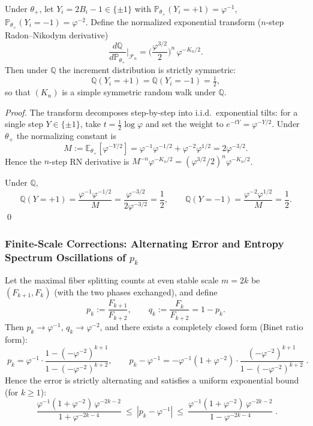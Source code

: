 \begin{proposition}\label{prop:pom-golden-esscher-symmetrization}
Under \(\theta_+\), let \(Y_i=2B_i-1\in\{\pm 1\}\) with \(\mathbb{P}_{\theta_+}(Y_i=+1)=\varphi^{-1}\), \(\mathbb{P}_{\theta_+}(Y_i=-1)=\varphi^{-2}\).
Define the normalized exponential transform (\(n\)-step Radon--Nikodym derivative)
\[
\boxed{\;
\frac{d\mathbb{Q}}{d\mathbb{P}_{\theta_+}}\Big|_{\mathcal{F}_n}
=\Big(\frac{\varphi^{3/2}}{2}\Big)^{n}\,\varphi^{-K_n/2}.\;}
\]
Then under \(\mathbb{Q}\) the increment distribution is strictly symmetric:
\[
\boxed{\;\mathbb{Q}(Y_i=+1)=\mathbb{Q}(Y_i=-1)=\tfrac12,\;}
\]
so that \((K_n)\) is a simple symmetric random walk under \(\mathbb{Q}\).
\end{proposition}

\begin{proof}
The transform decomposes step-by-step into i.i.d.\ exponential tilts: for a single step \(Y\in\{\pm 1\}\), take
\(
t=\tfrac12\log\varphi
\)
and set the weight to \(e^{-tY}=\varphi^{-Y/2}\).
Under \(\theta_+\) the normalizing constant is
\[
M:=\mathbb{E}_{\theta_+}[\varphi^{-Y/2}]
=\varphi^{-1}\varphi^{-1/2}+\varphi^{-2}\varphi^{1/2}
=2\varphi^{-3/2}.
\]
Hence the \(n\)-step RN derivative is \(M^{-n}\varphi^{-K_n/2}=(\varphi^{3/2}/2)^n\varphi^{-K_n/2}\).
\par
Under \(\mathbb{Q}\),
\[
\mathbb{Q}(Y=+1)=\frac{\varphi^{-1}\varphi^{-1/2}}{M}
=\frac{\varphi^{-3/2}}{2\varphi^{-3/2}}=\frac12,
\qquad
\mathbb{Q}(Y=-1)=\frac{\varphi^{-2}\varphi^{1/2}}{M}=\frac12.
\]
\qed
\end{proof}

\subsubsection{Finite-Scale Corrections: Alternating Error and Entropy Spectrum Oscillations of \texorpdfstring{$p_k$}{p\_k}}

\begin{proposition}\label{prop:pom-max-fiber-split-ratio-finite-scale}
Let the maximal fiber splitting counts at even stable scale \(m=2k\) be \((F_{k+1},F_k)\) (with the two phases exchanged), and define
\[
p_k:=\frac{F_{k+1}}{F_{k+2}},\qquad q_k:=\frac{F_k}{F_{k+2}}=1-p_k.
\]
Then \(p_k\to\varphi^{-1}\), \(q_k\to\varphi^{-2}\), and there exists a completely closed form (Binet ratio form):
\[
\boxed{\;
p_k=\varphi^{-1}\cdot\frac{1-(-\varphi^{-2})^{k+1}}{1-(-\varphi^{-2})^{k+2}},\qquad
p_k-\varphi^{-1}
=-\varphi^{-1}(1+\varphi^{-2})\cdot
\frac{(-\varphi^{-2})^{k+1}}{1-(-\varphi^{-2})^{k+2}}\; }.
\]
Hence the error is strictly alternating and satisfies a uniform exponential bound (for \(k\ge 1\)):
\[
\boxed{\;
\frac{\varphi^{-1}(1+\varphi^{-2})\,\varphi^{-2k-2}}{1+\varphi^{-2k-4}}
\ \le\
|p_k-\varphi^{-1}|
\ \le\
\frac{\varphi^{-1}(1+\varphi^{-2})\,\varphi^{-2k-2}}{1-\varphi^{-2k-4}}\; }.
\]
\end{proposition}

